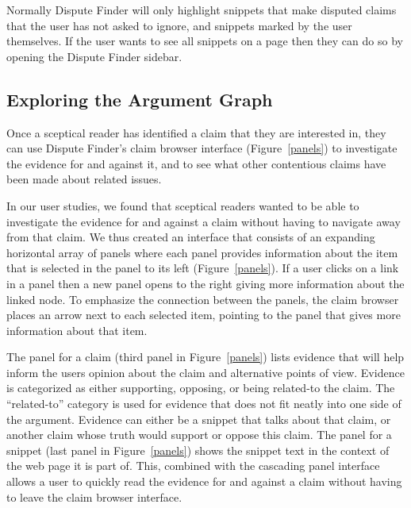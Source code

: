 \documentclass{www2010-submission}
\newcommand{\todo}[1]{}
\begin{document}
Normally Dispute Finder will only highlight snippets that make disputed claims that the user has not asked to ignore, and snippets marked by the user themselves. If the user wants to see all snippets on a page then they can do so by opening the Dispute Finder sidebar. 

\todo{ignore button}
\todo{talk about the margin?}
\todo{Talk about snippet and topic previewing}

\subsection{Exploring the Argument Graph}

Once a sceptical reader has identified a claim that they are interested in, they can use Dispute Finder's claim browser interface (Figure~\ref{panels}) to investigate the evidence for and against it, and to see what other contentious claims have been made about related issues. 

In our user studies, we found that sceptical readers wanted to be able to investigate the evidence for and against a claim without having to navigate away from that claim. We thus created an interface that consists of an expanding horizontal array of panels where each panel provides information about the item that is selected in the panel to its left (Figure~\ref{panels}). If a user clicks on a link in a panel then a new panel opens to the right giving more information about the linked node. To emphasize the connection between the panels, the claim browser places an arrow next to each selected item, pointing to the panel that gives more information about that item.

The panel for a claim (third panel in Figure~\ref{panels}) lists evidence that will help inform the users opinion about the claim and alternative points of view. Evidence is categorized as either supporting, opposing, or being related-to the claim. The ``related-to'' category is used for evidence that does not fit neatly into one side of the argument. Evidence can either be a snippet that talks about that claim, or another claim whose truth would support or oppose this claim.  The panel for a snippet (last panel in Figure~\ref{panels}) shows the snippet text in the context of the web page it is part of. This, combined with the cascading panel interface allows a user to quickly read the evidence for and against a claim without having to leave the claim browser interface.

\todo{Remove ``related`` from the topics list - confuses with related claims}
\todo{Show the other panels?}
\end{document}
